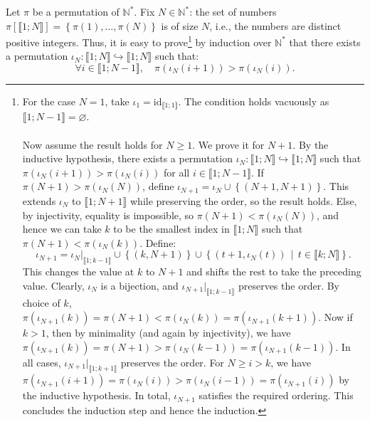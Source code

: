 \documentclass[11pt, a4paper, oneside]{article}
\theoremstyle{remark}
\theoremstyle{lemma}
\begin{document}
Let \(\pi\) be a permutation of \(\mathbb{N}^{*}\). Fix \(N \in \mathbb{N}^{*}\): the set of numbers \(\pi\left[\llbracket 1;N \rrbracket\right] = \left\{\pi(1), \ldots, \pi(N)\right\}\) is of size \(N\), i.e., the numbers are distinct positive integers. Thus, it is easy to prove\footnote{For the case \(N=1\), take \(\iota_1 = \mathrm{id}_{\llbracket 1;1 \rrbracket}\). The condition holds vacuously as \(\llbracket 1;N-1 \rrbracket = \varnothing\).
\\\\
Now assume the result holds for \(N \geq 1\). We prove it for \(N+1\). By the inductive hypothesis, there exists a permutation \(\iota_N \colon \llbracket 1;N \rrbracket \hookrightarrow \llbracket 1;N \rrbracket\) such that \(\pi\left(\iota_N(i+1)\right) > \pi\left(\iota_N(i)\right)\) for all \(i \in \llbracket 1;N-1 \rrbracket\). If \(\pi(N+1) > \pi\left(\iota_N(N)\right)\), define \(\iota_{N+1} = \iota_N \cup \left\{(N+1, N+1)\right\}\). This extends \(\iota_N\) to \(\llbracket 1;N+1 \rrbracket\) while preserving the order, so the result holds. Else, by injectivity, equality is impossible, so \(\pi(N+1) < \pi\left(\iota_N(N)\right)\), and hence we can take \(k\) to be the smallest index in \(\llbracket 1;N \rrbracket\) such that \(\pi(N+1) < \pi\left(\iota_N(k)\right)\). Define:
\[
\iota_{N+1} = \iota_N|_{\llbracket1;k-1\rrbracket} \cup \left\{(k, N+1)\right\} \cup \left\{(t+1, \iota_N(t))\,\middle|\, t \in \llbracket k;N \rrbracket\right\}.
\]
This changes the value at \(k\) to \(N+1\) and shifts the rest to take the preceding value. Clearly, \(\iota_N\) is a bijection, and \(\iota_{N+1}|_{\llbracket1;k-1\rrbracket}\) preserves the order. By choice of \(k\), \(\pi\left(\iota_{N+1}(k)\right) = \pi(N+1) < \pi\left(\iota_N(k)\right) = \pi\left(\iota_{N+1}(k+1)\right)\). Now if \(k > 1\), then by minimality (and again by injectivity), we have \(\pi\left(\iota_{N+1}(k)\right) = \pi(N+1) > \pi\left(\iota_N(k-1)\right) = \pi\left(\iota_{N+1}(k-1)\right)\). In all cases, \(\iota_{N+1}|_{\llbracket1;k+1\rrbracket}\) preserves the order. For \(N \geq i > k\), we have \(\pi\left(\iota_{N+1}(i+1)\right) = \pi\left(\iota_N(i)\right) > \pi\left(\iota_N(i-1)\right) = \pi\left(\iota_{N+1}(i)\right)\) by the inductive hypothesis. In total, \(\iota_{N+1}\) satisfies the required ordering. This concludes the induction step and hence the induction.} by induction over \(\mathbb{N}^{*}\) that there exists a permutation \(\iota_N \colon \llbracket 1;N \rrbracket \hookrightarrow \llbracket 1;N \rrbracket\) such that:
\[
\forall i \in \llbracket 1;N-1 \rrbracket,\quad \pi\left(\iota_N(i+1)\right) > \pi\left(\iota_N(i)\right).
\]
\end{document}
